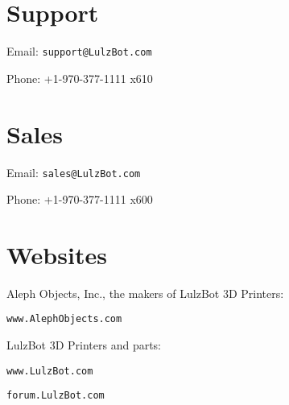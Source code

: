 \section{Support}
\setlength{\parindent}{0pt}
Email: \texttt{support@LulzBot.com}

Phone: +1-970-377-1111 x610

\section{Sales}

Email: \texttt{sales@LulzBot.com}

Phone: +1-970-377-1111 x600

\section{Websites}

Aleph Objects, Inc., the makers of LulzBot 3D Printers:

\texttt{www.AlephObjects.com}


LulzBot 3D Printers and parts:

\texttt{www.LulzBot.com}

\texttt{forum.LulzBot.com}
